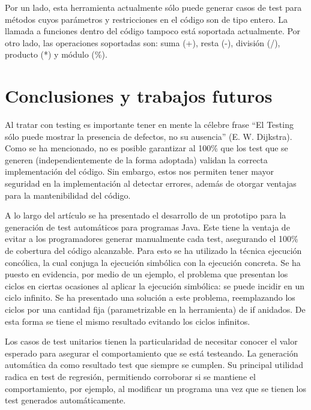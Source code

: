 \documentclass{llncs}
\begin{document}
Por un lado, esta herramienta actualmente sólo puede generar casos de test para métodos cuyos parámetros y restricciones en el código son de tipo entero.
La llamada a funciones dentro del código tampoco está soportada actualmente. Por otro lado, las operaciones soportadas son: suma (+), resta (-),
división (/), producto (*) y módulo (\%).

\section{Conclusiones y trabajos futuros}
Al tratar con testing es importante tener en mente la célebre frase “El Testing sólo puede mostrar la presencia de defectos, no su ausencia” (E. W. Dijkstra).
Como se ha mencionado, no es posible garantizar al 100\% que los test que se generen (independientemente de la forma adoptada) validan la correcta
implementación del código. Sin embargo, estos nos permiten tener mayor seguridad en la implementación al detectar errores, además de otorgar ventajas
para la mantenibilidad del código.

A lo largo del artículo se ha presentado el desarrollo de un prototipo para la generación de test automáticos para programas Java. Este tiene la ventaja
de evitar a los programadores generar manualmente cada test, asegurando el 100\% de cobertura del código alcanzable. Para esto se ha utilizado la
técnica ejecución concólica, la cual conjuga la ejecución simbólica con la ejecución concreta. Se ha puesto en evidencia, por medio de un ejemplo,
el problema que presentan los ciclos en ciertas ocasiones al aplicar la ejecución simbólica: se puede incidir en un ciclo infinito.
Se ha presentado una solución a este problema, reemplazando los ciclos por una cantidad fija (parametrizable en la herramienta) de if anidados.
De esta forma se tiene el mismo resultado evitando los ciclos infinitos.

Los casos de test unitarios tienen la particularidad de necesitar conocer el valor esperado para asegurar el comportamiento que se está testeando.
La generación automática da como resultado test que siempre se cumplen. Su principal utilidad radica en test de regresión, permitiendo corroborar
si se mantiene el comportamiento, por ejemplo, al modificar un programa una vez que se tienen los test generados automáticamente.
\end{document}
